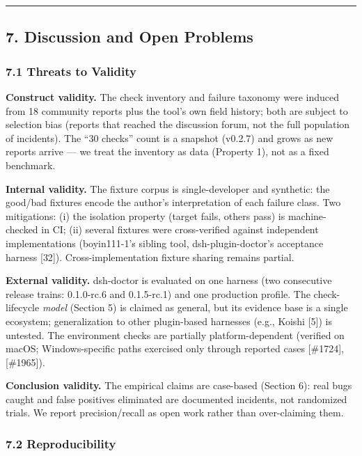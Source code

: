 \documentclass[
]{article}
\begin{document}
\begin{center}\rule{0.5\linewidth}{0.5pt}\end{center}

\subsection{7. Discussion and Open
Problems}\label{discussion-and-open-problems}

\subsubsection{7.1 Threats to Validity}\label{threats-to-validity}

\textbf{Construct validity.} The check inventory and failure taxonomy
were induced from 18 community reports plus the tool's own field
history; both are subject to selection bias (reports that reached the
discussion forum, not the full population of incidents). The ``30
checks'' count is a snapshot (v0.2.7) and grows as new reports arrive
--- we treat the inventory as data (Property 1), not as a fixed
benchmark.

\textbf{Internal validity.} The fixture corpus is single-developer and
synthetic: the good/bad fixtures encode the author's interpretation of
each failure class. Two mitigations: (i) the isolation property (target
fails, others pass) is machine-checked in CI; (ii) several fixtures were
cross-verified against independent implementations (boyin111-1's sibling
tool, dsh-plugin-doctor's acceptance harness {[}32{]}).
Cross-implementation fixture sharing remains partial.

\textbf{External validity.} dsh-doctor is evaluated on one harness
(two consecutive release trains: 0.1.0-rc.6 and 0.1.5-rc.1) and one production profile. The
check-lifecycle \emph{model} (Section 5) is claimed as general, but its
evidence base is a single ecosystem; generalization to other
plugin-based harnesses (e.g., Koishi {[}5{]}) is untested. The
environment checks are partially platform-dependent (verified on macOS;
Windows-specific paths exercised only through reported cases
{[}\#1724{]}, {[}\#1965{]}).

\textbf{Conclusion validity.} The empirical claims are case-based
(Section 6): real bugs caught and false positives eliminated are
documented incidents, not randomized trials. We report precision/recall
as open work rather than over-claiming them.

\subsubsection{7.2 Reproducibility}\label{reproducibility}
\end{document}
